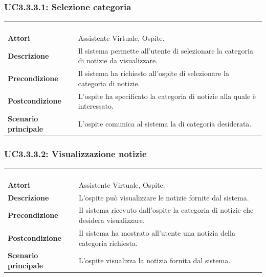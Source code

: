 \subsubsection{UC3.3.3.1: Selezione categoria}
\label{UC3.3.3.1}
\begin{longtable}{l|p{10cm}}
	\rowcolor[gray]{0.8} \multicolumn{2}{c}{} \\
	\rowcolor[gray]{0.8} \multicolumn{2}{c}{\textbf{UC3.3.3.1 - Selezione categoria}} \\
	\rowcolor[gray]{0.8} \multicolumn{2}{c}{} \\
	\hline
	&\\
	\textbf{Attori} & Assistente Virtuale, Ospite.\\[7pt]
	\textbf{Descrizione} & Il sistema permette all'utente di selezionare la categoria di notizie da visualizzare.\\[7pt]
	\textbf{Precondizione} & Il sistema ha richiesto all'ospite di selezionare la categoria di notizie.\\[7pt]
	\textbf{Postcondizione} & L'ospite ha specificato la categoria di notizie alla quale è interessato.\\[7pt]
	\textbf{Scenario principale} &L'ospite comunica al sistema la di categoria desiderata.\\[7pt]\hline
\end{longtable}

\subsubsection{UC3.3.3.2: Visualizzazione notizie}
\label{UC3.3.3.2}
\begin{longtable}{l|p{10cm}}
	\rowcolor[gray]{0.8} \multicolumn{2}{c}{} \\
	\rowcolor[gray]{0.8} \multicolumn{2}{c}{\textbf{UC3.3.3.2 - Visualizzazione notizie}} \\
	\rowcolor[gray]{0.8} \multicolumn{2}{c}{} \\
	\hline
	&\\
	\textbf{Attori} & Assistente Virtuale, Ospite.\\[7pt]
	\textbf{Descrizione} & L'ospite può visualizzare le notizie fornite dal sistema.\\[7pt]
	\textbf{Precondizione} & Il sistema ricevuto dall'ospite la categoria di notizie che desidera visualizzare.\\[7pt]
	\textbf{Postcondizione} & Il sistema ha mostrato all'utente una notizia della categoria richiesta.\\[7pt]
	\textbf{Scenario principale} &L'ospite visualizza la notizia fornita dal sistema.\\[7pt]\hline
\end{longtable}

